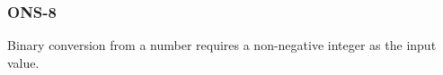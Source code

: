 \subsubsection{ONS-8}\label{sec:error_code_ons_8}

Binary conversion from a number requires a non-negative integer as the input value.


